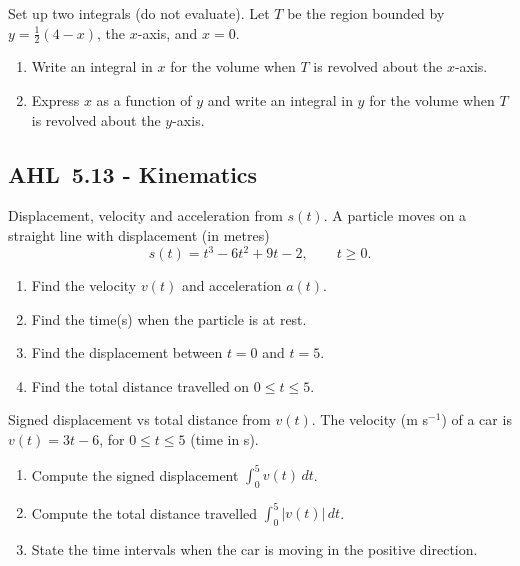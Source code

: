 \documentclass[11pt]{article}
\def\textbf#1{#1}%
\newcommand{\tocsubsection}[1]{\subsection{#1}}
\newcounter{question}
\begin{document}
\begin{question}
\textbf{Set up two integrals (do not evaluate).}
Let \(T\) be the region bounded by \(y=\tfrac12(4-x)\), the \(x\)-axis, and \(x=0\).
\begin{enumerate}
  \item Write an integral in \(x\) for the volume when \(T\) is revolved about the \(x\)-axis.
  \item Express \(x\) as a function of \(y\) and write an integral in \(y\) for the volume when \(T\) is revolved about the \(y\)-axis.
\end{enumerate}

\begin{center}
\end{center}
\end{question}




\tocsubsection{AHL 5.13 - Kinematics}

\begin{question}
\textbf{Displacement, velocity and acceleration from $s(t)$.}
A particle moves on a straight line with displacement (in metres) 
\[ s(t)=t^{3}-6t^{2}+9t-2,\qquad t\ge 0. \]
\begin{enumerate}
  \item Find the velocity $v(t)$ and acceleration $a(t)$.
  \item Find the time(s) when the particle is at rest.
  \item Find the displacement between $t=0$ and $t=5$.
  \item Find the total distance travelled on $0\le t\le 5$.
\end{enumerate}
\end{question}

\begin{question}
\textbf{Signed displacement vs total distance from $v(t)$.}
The velocity (m s$^{-1}$) of a car is \(v(t)=3t-6\), for \(0\le t\le 5\) (time in s).
\begin{enumerate}
  \item Compute the signed displacement \(\displaystyle \int_{0}^{5} v(t)\,dt\).
  \item Compute the total distance travelled \(\displaystyle \int_{0}^{5} |v(t)|\,dt\).
  \item State the time intervals when the car is moving in the positive direction.
\end{enumerate}
\end{question}
\end{document}
